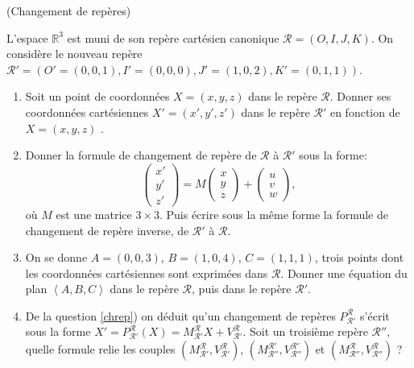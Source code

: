 \documentclass[a4paper,12pt,reqno]{amsart}
\begin{document}
\begin{exo} (Changement de repères)

  L'espace $\mathbb{R}^{3}$ est muni de son repère cartésien canonique $\mathcal{R}=(O,I,J,K)$. On considère le nouveau repère $\mathcal{R}'=\left( O'=(0, 0, 1), I'=(0, 0, 0), J'=(1, 0, 2), K'=(0, 1, 1) \right)$.
  \begin{enumerate}
    \item Soit un point de coordonnées $X=(x, y, z)$ dans le repère $\mathcal{R}$. Donner ses coordonnées cartésiennes $X'=(x', y', z')$ dans le repère $\mathcal{R}'$ en fonction de $X=(x, y, z)$ .

    \item \label{chrep} Donner la formule de changement de repère de $\mathcal{R}$ à $\mathcal{R'}$ sous la forme:
      \[
        \left(\begin{array}{c} x' \\ y' \\ z'\end{array}\right) =
        M \left(\begin{array}{c} x \\ y \\ z \end{array}\right) +
          \left(\begin{array}{c} u \\ v \\ w \end{array}\right),
      \]
    où $M$ est une matrice $3\times3$. Puis écrire sous la même forme la formule de changement de repère inverse, de $\mathcal{R'}$ à $\mathcal{R}$.

    \item On se donne $A=(0, 0, 3)$, $B=(1, 0, 4)$, $C=(1, 1, 1)$, trois points dont les coordonnées cartésiennes sont exprimées dans $\mathcal{R}$. Donner une équation du plan $\left<A,B,C\right>$ dans le repère $\mathcal{R}$, puis dans le repère $\mathcal{R}'$.

    \item \label{compchrep} De la question \ref{chrep}) on déduit qu'un changement de repères $P_{\mathcal{R}'}^{\mathcal{R}}$ s'écrit sous la forme $X'=P_{\mathcal{R}'}^{\mathcal{R}}(X)=M_{\mathcal{R}'}^{\mathcal{R}}X+V_{\mathcal{R}'}^{\mathcal{R}}$. Soit un troisième repère $\mathcal{R}''$, quelle formule relie les couples $(M_{\mathcal{R}'}^{\mathcal{R}},V_{\mathcal{R}'}^{\mathcal{R}})$, $(M_{\mathcal{R}''}^{\mathcal{R}'},V_{\mathcal{R}''}^{\mathcal{R}'})$ et $(M_{\mathcal{R}''}^{\mathcal{R}},V_{\mathcal{R}''}^{\mathcal{R}})$ ?


\end{enumerate}
\end{exo}
\end{document}
